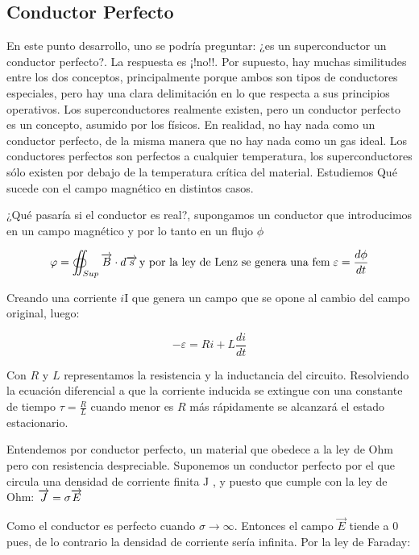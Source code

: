 \subsection{Conductor Perfecto}

En este punto desarrollo, uno se podría preguntar: ¿es un superconductor un conductor perfecto?. La respuesta es ¡!no!!. Por supuesto, hay muchas similitudes entre los dos conceptos, principalmente porque ambos son tipos de conductores especiales, pero hay una clara delimitación en lo que respecta a sus principios operativos. Los superconductores realmente existen, pero un conductor perfecto es un concepto, asumido por los físicos. En realidad, no hay nada como un conductor perfecto, de la misma manera que no hay nada como un gas ideal. Los conductores perfectos son perfectos a cualquier temperatura, los superconductores sólo existen por debajo de la temperatura crítica del material. Estudiemos Qué sucede con el campo magnético en distintos casos.

¿Qué pasaría si el conductor es real?, supongamos un conductor que introducimos en un campo magnético y por lo tanto en un flujo $\phi$

\begin{equation}
	\varphi=\oiint_{Sup}\overrightarrow{B} \cdot d\overrightarrow{s } \, \text{y por la ley de Lenz se genera una fem} \; \varepsilon=\frac{d\phi}{dt}
\end{equation}

Creando una corriente $i$I que genera un campo que se opone al cambio del campo original, luego:

\begin{equation}
	- \varepsilon= Ri+L\frac{di}{dt}
\end{equation}

Con $R$ y $L$ representamos la resistencia y la inductancia del circuito. Resolviendo la ecuación diferencial a que la corriente inducida se extingue con una constante de tiempo $\tau=\frac{R}{L}$ cuando menor es $R$ más rápidamente se alcanzará el estado estacionario.

Entendemos por conductor perfecto, un material que obedece a la ley de Ohm pero con resistencia despreciable. Suponemos un conductor perfecto por el que circula una densidad de corriente finita J , y puesto que cumple con la ley de Ohm: $\overrightarrow{J}=\sigma \overrightarrow{E}$

Como el conductor es perfecto cuando $\sigma\rightarrow \infty$. Entonces el campo $\overrightarrow{E}$ tiende a 0 pues, de lo contrario la densidad de corriente sería infinita. Por la ley de Faraday:

